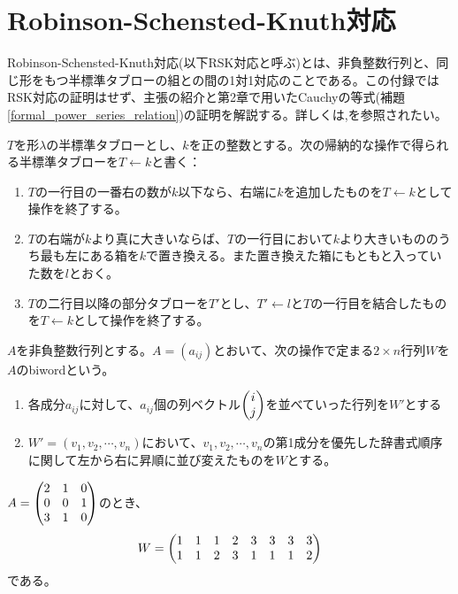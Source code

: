 \documentclass{ltjsreport}
\begin{document}
\chapter{Robinson-Schensted-Knuth対応}

Robinson-Schensted-Knuth対応(以下RSK対応と呼ぶ)とは、非負整数行列と、同じ形をもつ半標準タブローの組との間の1対1対応のことである。この付録ではRSK対応の証明はせず、主張の紹介と第2章で用いたCauchyの等式(補題\ref{formal_power_series_relation})の証明を解説する。詳しくは\cite{young_tableau},\cite{knuth}を参照されたい。

\begin{defin}[行挿入]
  $T$を形$\lambda$の半標準タブローとし、$k$を正の整数とする。次の帰納的な操作で得られる半標準タブローを$T\leftarrow k$と書く：
  \begin{enumerate}
    \item $T$の一行目の一番右の数が$k$以下なら、右端に$k$を追加したものを$T\leftarrow k$として操作を終了する。
    \item $T$の右端が$k$より真に大きいならば、$T$の一行目において$k$より大きいもののうち最も左にある箱を$k$で置き換える。また置き換えた箱にもともと入っていた数を$l$とおく。
    \item $T$の二行目以降の部分タブローを$T'$とし、$T'\leftarrow l$と$T$の一行目を結合したものを$T\leftarrow k$として操作を終了する。
  \end{enumerate}
\end{defin}

\begin{defin}
  $A$を非負整数行列とする。$A=(a_{ij})$とおいて、次の操作で定まる$2\times n$行列$W$を$A$のbiwordという。
  \begin{enumerate}
    \item 各成分$a_{ij}$に対して、$a_{ij}$個の列ベクトル$\begin{pmatrix} i\\j \end{pmatrix}$を並べていった行列を$W'$とする
    \item $W'=(v_1,v_2,\cdots,v_n)$において、$v_1,v_2,\cdots,v_n$の第1成分を優先した辞書式順序に関して左から右に昇順に並び変えたものを$W$とする。
  \end{enumerate}
\end{defin}

\begin{eg}
  $A=\begin{pmatrix} 2 & 1 & 0\\0 &0 &1\\3 &1 &0 \end{pmatrix}$のとき、
  \[
  W=\begin{pmatrix} 
    1 & 1 & 1 & 2 & 3 & 3 & 3 & 3\\
    1 & 1 & 2 & 3 & 1 & 1 & 1 & 2
   \end{pmatrix}
  \]
  である。
\end{eg}
\end{document}
